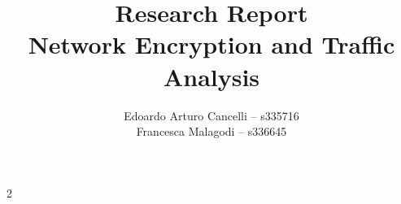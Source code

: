 \documentclass[a4paper,11pt,oneside]{article}
\title{Research Report\\Network Encryption and Traffic Analysis}
\author{Edoardo Arturo Cancelli -- s335716\\
Francesca Malagodi -- s336645}
\begin{document}
\maketitle

\begin{abstract}

\end{abstract}

\tableofcontents














\begin{multicols}{2}


\end{multicols}
\end{document}
